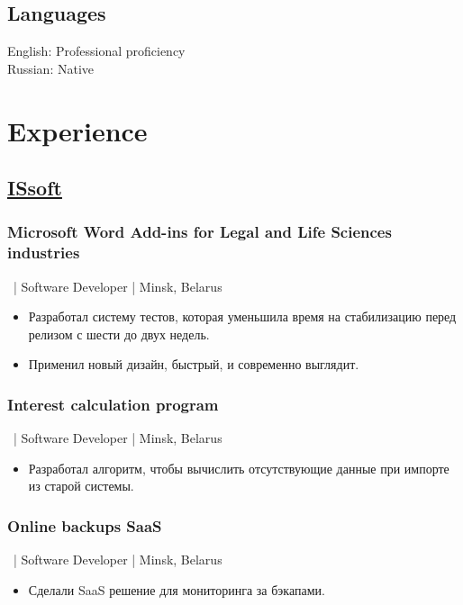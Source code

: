 \documentclass[a4paper]{article}
\begin{document}
\begin{minipage}[t]{0.39\textwidth}
    \subsection*{Languages}
    English: Professional proficiency\\
    Russian: Native

  \end{minipage}
  \begin{minipage}[t]{0.6\textwidth}

    \section*{Experience}
    \subsection*{\href{http://www.issoft.by/}{ISsoft}}
	\subsubsection*{Microsoft Word Add-ins for Legal and Life Sciences industries}
    \ | Software Developer | Minsk, Belarus
    \begin{itemize}
      \item Разработал систему тестов, которая уменьшила время на стабилизацию перед релизом с шести до двух недель.
      \item Применил новый дизайн, быстрый, и современно выглядит.
    \end{itemize}
	
	\subsubsection*{Interest calculation program}
    \ | Software Developer | Minsk, Belarus
	\begin{itemize}
      \item Разработал алгоритм, чтобы вычислить отсутствующие данные при импорте из старой системы.
    \end{itemize}

	\subsubsection*{Online backups SaaS}
	\ | Software Developer | Minsk, Belarus
    \begin{itemize}
      \item Сделали SaaS решение для мониторинга за бэкапами.
    \end{itemize}
	

\end{minipage}
\end{document}
